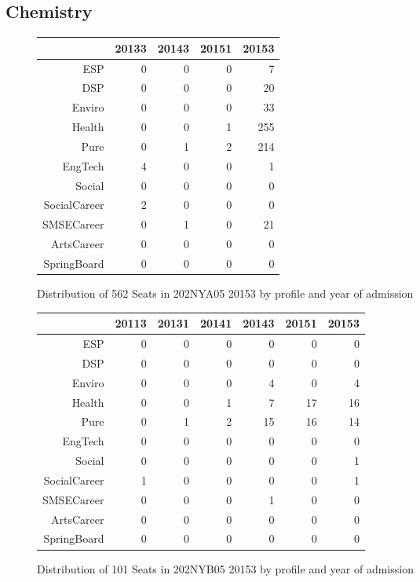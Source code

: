 \documentclass{article}\usepackage[]{graphicx}\usepackage[]{color}
\begin{document}
\subsection{Chemistry}
\begin{figure}[H]
\centering
\begin{tabular}{rrrrr}
  \hline
 & 20133 & 20143 & 20151 & 20153 \\ 
  \hline
ESP &   0 &   0 &   0 &   7 \\ 
  DSP &   0 &   0 &   0 &  20 \\ 
  Enviro &   0 &   0 &   0 &  33 \\ 
  Health &   0 &   0 &   1 & 255 \\ 
  Pure &   0 &   1 &   2 & 214 \\ 
  EngTech &   4 &   0 &   0 &   1 \\ 
  Social &   0 &   0 &   0 &   0 \\ 
  SocialCareer &   2 &   0 &   0 &   0 \\ 
  SMSECareer &   0 &   1 &   0 &  21 \\ 
  ArtsCareer &   0 &   0 &   0 &   0 \\ 
  SpringBoard &   0 &   0 &   0 &   0 \\ 
   \hline
\end{tabular}
\caption{Distribution of 562 Seats in 202NYA05 20153 by profile and year of admission} 
\end{figure}
\begin{figure}[H]
\centering
\begin{tabular}{rrrrrrr}
  \hline
 & 20113 & 20131 & 20141 & 20143 & 20151 & 20153 \\ 
  \hline
ESP &   0 &   0 &   0 &   0 &   0 &   0 \\ 
  DSP &   0 &   0 &   0 &   0 &   0 &   0 \\ 
  Enviro &   0 &   0 &   0 &   4 &   0 &   4 \\ 
  Health &   0 &   0 &   1 &   7 &  17 &  16 \\ 
  Pure &   0 &   1 &   2 &  15 &  16 &  14 \\ 
  EngTech &   0 &   0 &   0 &   0 &   0 &   0 \\ 
  Social &   0 &   0 &   0 &   0 &   0 &   1 \\ 
  SocialCareer &   1 &   0 &   0 &   0 &   0 &   1 \\ 
  SMSECareer &   0 &   0 &   0 &   1 &   0 &   0 \\ 
  ArtsCareer &   0 &   0 &   0 &   0 &   0 &   0 \\ 
  SpringBoard &   0 &   0 &   0 &   0 &   0 &   0 \\ 
   \hline
\end{tabular}
\caption{Distribution of 101 Seats in 202NYB05 20153 by profile and year of admission} 
\end{figure}
\end{document}
